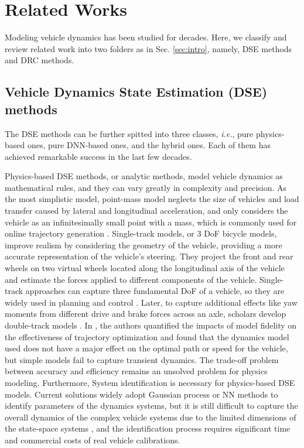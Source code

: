 \section{Related Works}
\label{sec:review}

Modeling vehicle dynamics has been studied for decades. Here, we classify and review related work into two folders as in Sec. \ref{sec:intro}, namely, DSE methods and DRC methods.

\subsection{Vehicle Dynamics State Estimation (DSE) methods}

The DSE methods can be further spitted into three classes, \textit{i.e.}, pure physics-based ones, pure DNN-based ones, and the hybrid ones. Each of them has achieved remarkable success in the last few decades. 

Physics-based DSE methods, or analytic methods, model vehicle dynamics as mathematical rules, and they can vary greatly in complexity and precision. 
As the most simplistic model, point-mass model \cite{Kapania} neglects the size of vehicles and load transfer caused by lateral and longitudinal acceleration, and only considers the vehicle as an infinitesimally small point with a mass, which is commonly used for online trajectory generation \cite{Subosits2019}. 
Single-track models, or 3 DoF bicycle models, \cite{Timings2013} improve realism by considering the geometry of the vehicle, providing a more accurate representation of the vehicle’s steering. They project the front and rear wheels on two virtual wheels located along the longitudinal axis of the vehicle and estimate the forces applied to different components of the vehicle. Single-track approaches can capture three fundamental DoF of a vehicle, so they are widely used in planning and control \cite{Liu2018}. Later, to capture additional effects like yaw moments from different drive and brake forces across an axle, scholars develop double-track models \cite{Perantoni04052014}. 
In \cite{Subosits2021}, the authors quantified the impacts of model fidelity on the effectiveness of trajectory optimization and found that the dynamics model used does not have a major effect on the optimal path or speed for the vehicle, but simple models fail to capture transient dynamics.
The trade-off problem between accuracy and efficiency remains an unsolved problem for physics modeling.
Furthermore, System identification is necessary for physics-based DSE models.
Current solutions widely adopt Gaussian process \cite{Kabzan2019} or NN methods \cite{COSTA2023104469} to identify parameters of the dynamics systems, but it is still difficult to capture the overall dynamics of the complex vehicle systems due to the limited dimensions of the state-space systems \cite{Johan2019}, and the identification process requires significant time and commercial costs of real vehicle calibrations. 

